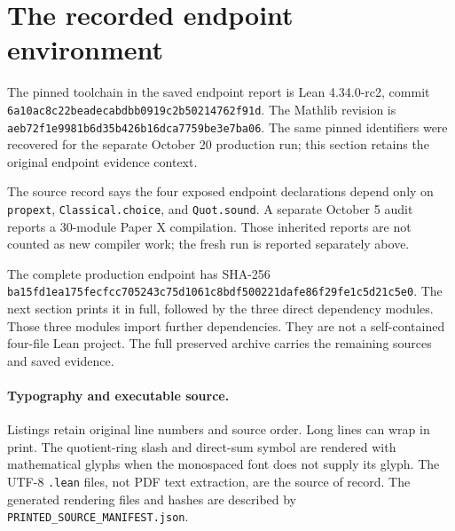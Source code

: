 \documentclass[11pt]{article}
\newcommand{\code}[1]{\nolinkurl{#1}}
\begin{document}
\KomorebiCover
\begin{abstract}
This guide explains the source contracts behind Paper X rather than treating its
terminal signature as a stand-in for the mathematics. It provides a concordance
of the twenty source records, follows the two independent construction branches,
and distinguishes arithmetic occurrence, finite trace recovery, carrier
presentations, local comparison data, and nonzero occupancy. Four complete
production modules are printed from preserved source. Their saved verification
and the separate October 20 production replay remain explicit.
\end{abstract}
\tableofcontents
\clearpage


\clearpage
\section{The recorded endpoint environment}
The pinned toolchain in the saved endpoint report is Lean 4.34.0-rc2, commit
\code{6a10ac8c22beadecabdbb0919c2b50214762f91d}. The Mathlib revision is
\code{aeb72f1e9981b6d35b426b16dca7759be3e7ba06}. The same pinned identifiers were recovered for the separate October 20
production run; this section retains the original endpoint evidence context.

The source record says the four exposed endpoint declarations depend only on
\code{propext}, \code{Classical.choice}, and \code{Quot.sound}. A separate
October 5 audit reports a 30-module Paper X compilation. Those inherited reports
are not counted as new compiler work; the fresh run is reported separately above.

The complete production endpoint has SHA-256
\code{ba15fd1ea175fecfcc705243c75d1061c8bdf500221dafe86f29fe1c5d21c5e0}.
The next section prints it in full, followed by the three direct dependency
modules. Those three modules import further dependencies. They are not a
self-contained four-file Lean project. The full preserved archive carries the
remaining sources and saved evidence.

\paragraph{Typography and executable source.}
Listings retain original line numbers and source order. Long lines can wrap in
print. The quotient-ring slash and direct-sum symbol are rendered with mathematical glyphs when the
monospaced font does not supply its glyph. The UTF-8 \code{.lean} files, not
PDF text extraction, are the source of record. The generated rendering files
and hashes are described by \code{PRINTED_SOURCE_MANIFEST.json}.
\end{document}
